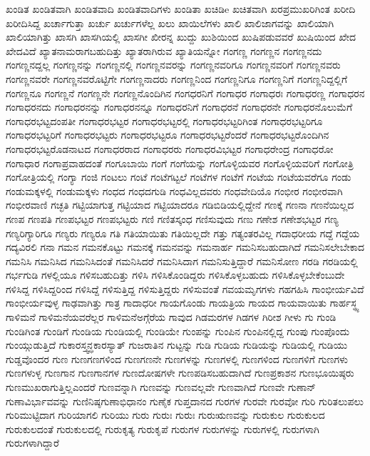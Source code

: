 {ಖಂಡಿತ
ಖಂಡಿತವಾಗಿ
ಖಂಡಿತವಾದಿ
ಖಂಡಿತವಾದಿಗಳು
ಖಂಡಿತಾ
ಖಚಿಡಿe
ಖಚಿತವಾಗಿ
ಖರಪ್ರಮುಖರಿಗಿಂತ
ಖರೀದಿ
ಖರೀದಿಸಿದ್ದ
ಖರ್ಚಾಗುತ್ತಾ
ಖರ್ಚು
ಖರ್ಚುಗಳೆಲ್ಲ
ಖಲು
ಖಾಯಿಲೆಗಳು
ಖಾಲಿ
ಖಾಲಿಜಾಗವನ್ನು
ಖಾಲಿಯಾಗಿ
ಖಾಲಿಯಾಗಿತ್ತು
ಖಾಸಗಿ
ಖಾಸಗಿಯಲ್ಲಿ
ಖಾಸಗೀ
ಖೀರನ್ನ
ಖುದ್ದು
ಖುಶಿಯಿಂದ
ಖುಷಿಪಡುವವರೆ
ಖುಷಿಯಿಂದ
ಖೇದ
ಖೇದವಿದೆ
ಖ್ಯಾತನಾಮರಾಗಬಹುದಿತ್ತು
ಖ್ಯಾತರಾಗಿರುವ
ಖ್ಯಾತಿಯನ್ನೋ
ಗಂಗಣ್ಣ
ಗಂಗಣ್ಣನ
ಗಂಗಣ್ಣನದು
ಗಂಗಣ್ಣನದ್ದಲ್ಲ
ಗಂಗಣ್ಣನನ್ನು
ಗಂಗಣ್ಣನಲ್ಲಿ
ಗಂಗಣ್ಣನವರನ್ನು
ಗಂಗಣ್ಣನವರಿಗೂ
ಗಂಗಣ್ಣನವರಿಗೆ
ಗಂಗಣ್ಣನವರು
ಗಂಗಣ್ಣನವರೇ
ಗಂಗಣ್ಣನವರೊಟ್ಟಿಗೇ
ಗಂಗಣ್ಣನಾದರು
ಗಂಗಣ್ಣನಿಂದ
ಗಂಗಣ್ಣನಿಗೂ
ಗಂಗಣ್ಣನಿಗೆ
ಗಂಗಣ್ಣನಿದ್ದಲ್ಲಿಗೆ
ಗಂಗಣ್ಣನೂ
ಗಂಗಣ್ಣನೆ
ಗಂಗಣ್ಣನೇ
ಗಂಗಣ್ಣನೊಂದಿಗಿನ
ಗಂಗಧರನಿಗೆ
ಗಂಗಾಧರ
ಗಂಗಾಧರಃ
ಗಂಗಾಧರಣ್ಣ
ಗಂಗಾಧರನ
ಗಂಗಾಧರನದು
ಗಂಗಾಧರನನ್ನು
ಗಂಗಾಧರನನ್ನೂ
ಗಂಗಾಧರನಿಗೆ
ಗಂಗಾಧರನೆ
ಗಂಗಾಧರನೇ
ಗಂಗಾಧರನೊಲುಮೆಗೆ
ಗಂಗಾಧರಭಟ್ಟದಂಪತೀ
ಗಂಗಾಧರಭಟ್ಟರ
ಗಂಗಾಧರಭಟ್ಟರಲ್ಲಿ
ಗಂಗಾಧರಭಟ್ಟರಿಗಿಂತ
ಗಂಗಾಧರಭಟ್ಟರಿಗೂ
ಗಂಗಾಧರಭಟ್ಟರಿಗೆ
ಗಂಗಾಧರಭಟ್ಟರು
ಗಂಗಾಧರಭಟ್ಟರೂ
ಗಂಗಾಧರಭಟ್ಟರೆಂದರೆ
ಗಂಗಾಧರಭಟ್ಟರೊಂದಿಗಿನ
ಗಂಗಾಧರಭಟ್ಟರೊಡನಾಟದ
ಗಂಗಾಧರರಾದ
ಗಂಗಾಧರರು
ಗಂಗಾಧರವಿಭಟ್ಟರ
ಗಂಗಾಧರೇಂದ್ರ
ಗಂಗಾಧರೋ
ಗಂಗಾಧಾರ
ಗಂಗಾಪ್ರವಾಹದಂತೆ
ಗಂಗೂಬಾಯಿ
ಗಂಗೆ
ಗಂಗೆಯನ್ನು
ಗಂಗೊಳ್ಳಿಯವರ
ಗಂಗೊಳ್ಳಿಯವರಿಗೆ
ಗಂಗೋತ್ರಿ
ಗಂಗೋತ್ರಿಯಲ್ಲಿ
ಗಂಗ್ಯಾ
ಗಂಜಿ
ಗಂಟಲು
ಗಂಟೆ
ಗಂಟೆಗಟ್ಟಲೆ
ಗಂಟೆಗಳ
ಗಂಟೆಗೆ
ಗಂಟೆಯ
ಗಂಟೆಯವರೆಗೂ
ಗಂಡು
ಗಂಡುಮಕ್ಕಳಲ್ಲಿ
ಗಂಡುಮಕ್ಕಳು
ಗಂಧದ
ಗಂಧದಗುಡಿ
ಗಂಧವಿಲ್ಲದವರು
ಗಂಧವೇದಿಯೊ
ಗಂಭೀರ
ಗಂಭೀರವಾಗಿ
ಗಂಭೀರವಾಣಿ
ಗಚ್ಛತಿ
ಗಟ್ಟಿಯಾಗುತ್ತ
ಗಟ್ಟಿಯಾದ
ಗಟ್ಟಿಯಾದರೂ
ಗಡಿಬಿಡಿಯಲ್ಲಿದ್ದೇನೆ
ಗಣಕ್ಕೆ
ಗಣನಾ
ಗಣನೆಯಿಲ್ಲದ
ಗಣಪ
ಗಣಪತಿ
ಗಣಪಭಟ್ಟರ
ಗಣಪಭಟ್ಟರು
ಗಣಿ
ಗಣಿತಸ್ಕಂಧ
ಗಣಿಸುವುದು
ಗಣು
ಗಣೇಶ
ಗಣೇಶಭಟ್ಟರ
ಗಣ್ಯ
ಗಣ್ಯರಿಗ್ಯಾರಿಗೂ
ಗಣ್ಯರು
ಗಣ್ಯರೂ
ಗತಿ
ಗತಿಯಾಯಿತು
ಗತಿಯಿಲ್ಲದೇ
ಗತ್ತು
ಗತ್ಯಂತರವಿಲ್ಲ
ಗದಾಧರೀಯ
ಗದ್ದೆ
ಗದ್ದೆಯ
ಗದ್ಯವಿರಲಿ
ಗನಾ
ಗಮನ
ಗಮನಕೊಟ್ಟು
ಗಮನಕ್ಕೆ
ಗಮನವನ್ನು
ಗಮನಾರ್ಹ
ಗಮನಿಸಬಹುದಾಗಿದೆ
ಗಮನಿಸಲೇಬೇಕಾದ
ಗಮನಿಸಿ
ಗಮನಿಸಿದ
ಗಮನಿಸಿದಂತೆ
ಗಮನಿಸಿದರೆ
ಗಮನಿಸಿದಾಗ
ಗಮನಿಸುತ್ತಿದ್ದಾರೆ
ಗಮನಿಸೋಣ
ಗರಡಿ
ಗರಡಿಯಲ್ಲಿ
ಗರ್ಭಗುಡಿ
ಗಳಲ್ಲಿಯೂ
ಗಳಿಸಬಹುದಿತ್ತು
ಗಳಿಸಿ
ಗಳಿಸಿಕೊಂಡಿದ್ದರು
ಗಳಿಸಿಕೊಳ್ಳಬಹುದು
ಗಳಿಸಿಕೊಳ್ಳಬೇಕೆಂಬುದೇ
ಗಳಿಸಿದ್ದ
ಗಳಿಸಿದ್ದರಿಂದ
ಗಳಿಸಿದ್ದೆ
ಗಳಿಸುತ್ತಿದ್ದ
ಗಳಿಸುತ್ತಿದ್ದರು
ಗಳಿಸುವಂತೆ
ಗವಯಮೃಗಗಳು
ಗಹಗಹಿಸಿ
ಗಾಂಭೀರ್ಯವಿದೆ
ಗಾಂಭೀರ್ಯವುಳ್ಳ
ಗಾಢವಾಗಿತ್ತು
ಗಾತ್ರ
ಗಾದಾಧರೀ
ಗಾಯಗೊಂಡು
ಗಾಯತ್ರಿಯ
ಗಾಯದ
ಗಾಯವಾಯಿತು
ಗಾರ್ಹಸ್ಥ್ಯ
ಗಾಳಿಮನೆ
ಗಾಳಿಮನೆಯವರೆಲ್ಲರ
ಗಾಳಿಮನೆಅಗ್ಗೆರೆಯ
ಗಾವುದ
ಗಿಡಮರಗಳ
ಗಿಡಗಳ
ಗಿರೀಶ
ಗೀಳು
ಗು
ಗುಂಡಿ
ಗುಂಡಿಗಿಂತ
ಗುಂಡಿಗೆ
ಗುಂಡಿಯ
ಗುಂಡಿಯಲ್ಲಿ
ಗುಂಡಿಯೇ
ಗುಂಪನ್ನು
ಗುಂಪಿನ
ಗುಂಪಿನಲ್ಲಿದ್ದ
ಗುಂಪು
ಗುಂಪೊಂದು
ಗುಂಯ್ಗುಡುತ್ತಿದೆ
ಗುಕಾರಸ್ತ್ವನ್ಧಕಾರಸ್ಯಾತ್
ಗುಜರಾತಿನ
ಗುಟ್ಟನ್ನು
ಗುಡಿ
ಗುಡಿಯ
ಗುಡಿಯನ್ನು
ಗುಡಿಯಲ್ಲಿ
ಗುಡಿಯು
ಗುಡ್ಡವೊಂದರ
ಗುಣ
ಗುಣಗಣಗಳಿಂದ
ಗುಣಗಣನೇ
ಗುಣಗಳನ್ನು
ಗುಣಗಳಲ್ಲಿ
ಗುಣಗಳಿಂದ
ಗುಣಗಳಿಗೆ
ಗುಣಗಳು
ಗುಣಗಳುಳ್ಳ
ಗುಣಗಾನ
ಗುಣಗಾನಗಳ
ಗುಣದೋಷಗಳೇ
ಗುಣಪಡಿಸಬಹುದಾಗಿದೆ
ಗುಣಪ್ರಕಾಶನ
ಗುಣಭೂಯಿಷ್ಠರು
ಗುಣಮುಖರಾಗುತ್ತಿಲ್ಲಎಂದರೆ
ಗುಣವನ್ನಾಗಿ
ಗುಣವನ್ನು
ಗುಣವಲ್ಲವೇ
ಗುಣವಾಗಿದೆ
ಗುಣವೇ
ಗುಣಾನ್
ಗುಣಾವಿರ್ಭಾವವನ್ನು
ಗುಣಿನಿಷ್ಠಗುಣಾಭಿಧಾನಂ
ಗುಣೈಕ
ಗುಪ್ತದಾನದ
ಗುರಗಳ
ಗುರವೇ
ಗುರವೋ
ಗುರಿ
ಗುರಿತಲುಪಲು
ಗುರಿಮುಟ್ಟಿದಾಗ
ಗುರಿಯಾಗಲಿ
ಗುರಿಯು
ಗುರು
ಗುರುಃ
ಗುರುಃ
ಗುರುಋಣವನ್ನು
ಗುರುಕುಲ
ಗುರುಕುಲದ
ಗುರುಕುಲದಂತೆ
ಗುರುಕುಲದಲ್ಲಿ
ಗುರುಕೃತ್ಯ
ಗುರುಕೃಪೆ
ಗುರುಗಳ
ಗುರುಗಳನ್ನು
ಗುರುಗಳಲ್ಲಿ
ಗುರುಗಳಾಗಿ
ಗುರುಗಳಾಗಿದ್ದಾರೆ
}
